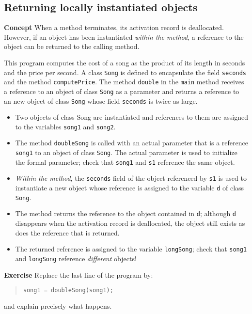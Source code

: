 \subsection{Returning locally instantiated objects}\label{method.09}

\textbf{Concept} When a method terminates, its activation record is deallocated.
However, if an object has been instantiated \emph{within the method},
a reference to the object can be returned to the calling method.


This program computes the cost of a song as the product of its length
in seconds and the price per second. A class \texttt{Song} is defined
to encapsulate the field \texttt{seconds} and the method \texttt{computePrice}.
The method \texttt{double} in the \texttt{main} method receives a reference
to an object of class \texttt{Song} as a parameter and returns a reference
to an new object of class \texttt{Song} whose field \texttt{seconds} is twice as large.

\begin{itemize}
\item Two objects of class Song are instantiated and references to them
are assigned to the variables \texttt{song1} and \texttt{song2}.
\item The method \texttt{doubleSong} is called with an actual parameter
that is a reference \texttt{song1} to an object of class \texttt{Song}.
The actual parameter is used to initialize the formal
parameter; check that \texttt{song1} and \texttt{s1} reference the same object.
\item \emph{Within the method}, the \texttt{seconds} field of the object referenced
by \texttt{s1} is used to instantiate a new object whose reference is assigned
to the variable \texttt{d} of class \texttt{Song}.
\item The method returns the reference to the object contained in \texttt{d};
although \texttt{d} disappears when the activation record is deallocated,
the object still exists as does the reference that is returned.
\item The returned reference is assigned to the variable \texttt{longSong};
check that \texttt{song1} and \texttt{longSong} reference \emph{different} objects!
\end{itemize}

\textbf{Exercise} Replace the last line of the program by:
\begin{quote}
\texttt{song1 = doubleSong(song1);}
\end{quote}
and explain precisely what happens.

